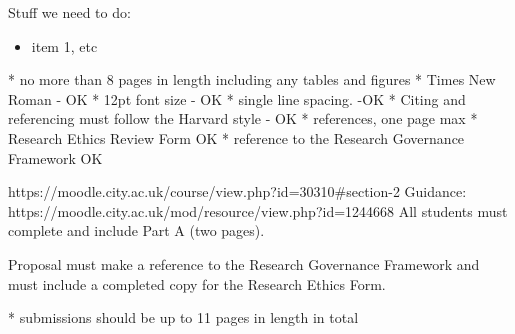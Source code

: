 

Stuff we need to do:
\begin{itemize}
    \item item 1, etc
\end{itemize}

* no more than 8 pages in length including any tables and figures 
* Times New Roman - OK
* 12pt font size  - OK
* single line spacing. -OK
* Citing and referencing must follow the Harvard style - OK
* references, one page max
* Research Ethics Review Form OK
* reference to the Research Governance Framework OK

https://moodle.city.ac.uk/course/view.php?id=30310#section-2
Guidance:
https://moodle.city.ac.uk/mod/resource/view.php?id=1244668
All students must complete and include Part A (two pages).

Proposal must make a reference to the Research Governance Framework and must include a completed copy for the Research Ethics Form. 


* submissions should be up to 11 pages in length in total
